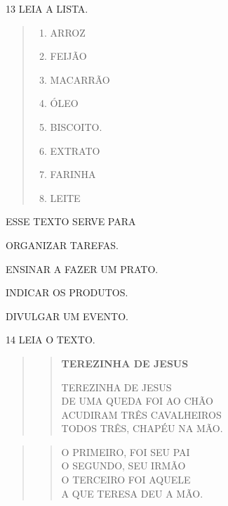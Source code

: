 \pagebreak
\num{13} LEIA A LISTA.

\begin{quote}
\begin{enumerate}
\item ARROZ

\item FEIJÃO

\item MACARRÃO

\item ÓLEO

\item BISCOITO.

\item EXTRATO

\item FARINHA

\item LEITE
\end{enumerate}
\end{quote}

ESSE TEXTO SERVE PARA

\begin{escolha}
\item ORGANIZAR TAREFAS.

\item ENSINAR A FAZER UM PRATO.

\item INDICAR OS PRODUTOS.

\item DIVULGAR UM EVENTO.
\end{escolha}

\num{14} LEIA O TEXTO. \enlargethispage{2\baselineskip}

\begin{quote}
\begin{verse}
\textbf{TEREZINHA DE JESUS}

TEREZINHA DE JESUS\\
DE UMA QUEDA FOI AO CHÃO\\
ACUDIRAM TRÊS CAVALHEIROS\\
TODOS TRÊS, CHAPÉU NA MÃO.
\end{verse}
\end{quote}

\begin{quote}
\begin{verse}
O PRIMEIRO, FOI SEU PAI\\
O SEGUNDO, SEU IRMÃO\\
O TERCEIRO FOI AQUELE\\
A QUE TERESA DEU A MÃO.

\end{verse}
\end{quote}

